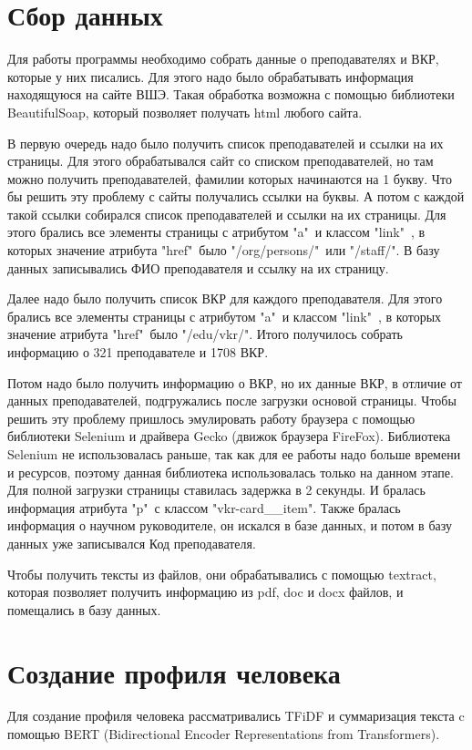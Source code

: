 \documentclass[PI,KR]{HSEUniversity}
\begin{document}
\section{Сбор данных}
Для работы программы необходимо собрать данные о преподавателях и ВКР, которые у них писались. Для этого надо было обрабатывать информация находящуюся на сайте ВШЭ. Такая обработка возможна с помощью библиотеки BeautifulSoap, который позволяет получать html любого сайта.

В первую очередь надо было получить список преподавателей и ссылки на их страницы. Для этого обрабатывался сайт со списком преподавателей, но там можно получить преподавателей, фамилии которых начинаются на 1 букву. Что бы решить эту проблему с сайты получались ссылки на буквы. А потом с каждой такой ссылки собирался список преподавателей и ссылки на их страницы. Для этого брались все элементы страницы с атрибутом "a"\ и классом "link"\ , в которых значение атрибута "href"\ было "/org/persons/"\ или "/staff/". В базу данных записывались ФИО преподавателя и ссылку на их страницу. 

Далее надо было получить список ВКР для каждого преподавателя. Для этого брались все элементы страницы с атрибутом "a"\ и классом "link"\ , в которых значение атрибута "href"\ было "/edu/vkr/". Итого получилось собрать информацию о 321 преподавателе и 1708 ВКР.

Потом надо было получить информацию о ВКР, но их данные ВКР, в отличие от данных преподавателей, подгружались после загрузки основой страницы. Чтобы решить эту проблему пришлось эмулировать работу браузера с помощью библиотеки Selenium и драйвера Gecko (движок браузера FireFox). Библиотека Selenium не использовалась раньше, так как для ее работы надо больше времени и ресурсов, поэтому данная библиотека использовалась только на данном этапе. Для полной загрузки страницы ставилась задержка в 2 секунды. И бралась информация атрибута "p"\ с классом "vkr-card\_\_item". Также бралась информация о научном руководителе, он искался в базе данных, и потом в базу данных уже записывался Код преподавателя.

Чтобы получить тексты из файлов, они обрабатывались с помощью textract, которая позволяет получить информацию из pdf, doc и docx файлов, и помещались в базу данных.
\section{Создание профиля человека}
Для создание профиля человека рассматривались TFiDF \cite{das2018improved} и суммаризация текста c помощью BERT \cite{devlin2019bert} (Bidirectional Encoder Representations from Transformers). 
\end{document}
